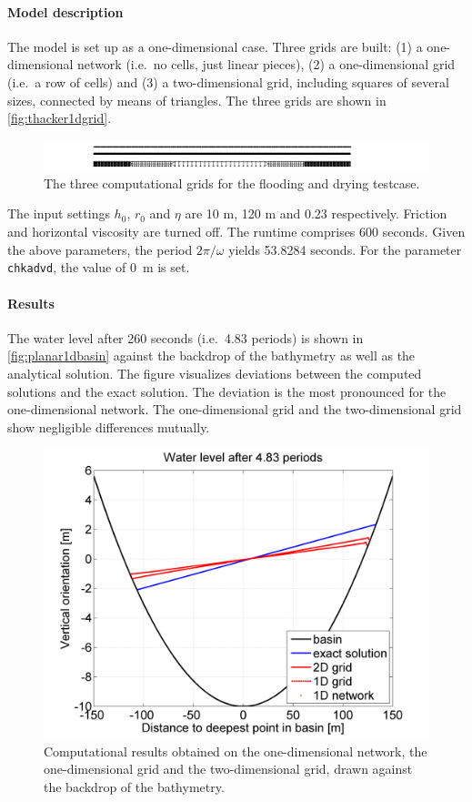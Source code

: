 \paragraph*{Model description}
The model is set up as a one-dimensional case. Three grids are built: (1) a one-dimensional network (i.e.\ no cells, just linear pieces), (2) a one-dimensional grid (i.e.\ a row of cells) and (3) a two-dimensional grid, including squares of several sizes, connected by means of triangles. The three grids are shown in \autoref{fig:thacker1dgrid}.

\begin{figure}[h!]
\begin{center}
\includegraphics[width=1.0\columnwidth]{figures/grid.png}
\end{center}\caption{The three computational grids for the flooding and drying testcase.  \label{fig:thacker1dgrid}}
\end{figure}

The input settings $h_0$, $r_0$ and $\eta$ are 10 m, 120 m and 0.23 respectively. Friction and horizontal viscosity are turned off. The runtime comprises 600 seconds. Given the above parameters, the period $2\pi/\omega$ yields 53.8284 seconds. For the parameter \texttt{chkadvd}, the value of 0~m is set.




\paragraph*{Results}
The water level after 260 seconds (i.e.\ 4.83 periods) is shown in \autoref{fig:planar1dbasin} against the backdrop of the bathymetry as well as the analytical solution. The figure visualizes deviations between the computed solutions and the exact solution. The deviation is the most pronounced for the one-dimensional network. The one-dimensional grid and the two-dimensional grid show negligible differences mutually.

\begin{figure}[h!]
\begin{center}
\includegraphics[width=0.57\columnwidth]{figures/planar1d.png}
\end{center}\caption{Computational results obtained on the one-dimensional network, the one-dimensional grid and the two-dimensional grid, drawn against the backdrop of the bathymetry. \label{fig:planar1dbasin}}
\end{figure}

